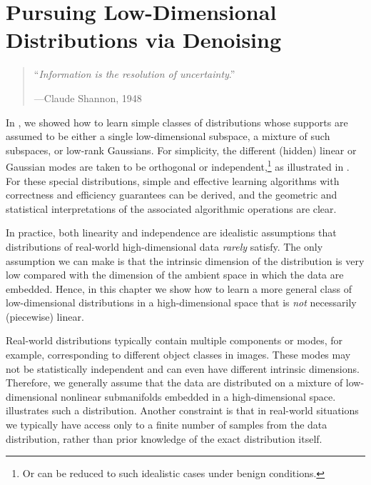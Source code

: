 \documentclass[../../book-main.tex]{subfiles}
\begin{document}
\chapter{Pursuing Low-Dimensional Distributions via Denoising}
\label{ch:denoising}

\begin{quote}
    \hfill ``\textit{Information is the resolution of uncertainty}.''

    \hfill ---Claude Shannon, 1948
\end{quote}
\vspace{5mm}

In , we showed how to learn simple classes of
distributions whose supports are assumed to be either a single
low-dimensional subspace, a mixture of such subspaces, or low-rank
Gaussians. For simplicity, the different (hidden) linear or Gaussian
modes are taken to be orthogonal or independent,\footnote{Or can be
reduced to such idealistic cases under benign conditions.} as
illustrated in . For these special distributions,
simple and effective learning algorithms with correctness and efficiency
guarantees can be derived, and the geometric and statistical
interpretations of the associated algorithmic operations are clear.

In practice, both linearity and independence are idealistic
assumptions that distributions of real-world high-dimensional data
\textit{rarely} satisfy. The only assumption we can make is that the
intrinsic dimension of the distribution is very low compared with the
dimension of the ambient space in which the data are embedded. Hence,
in this chapter we show how to learn a more general class of
low-dimensional distributions in a high-dimensional space that is
\textit{not} necessarily (piecewise) linear.

Real-world distributions typically contain multiple components or
modes, for example, corresponding to different object classes in
images. These modes may not be statistically independent and can even
have different intrinsic dimensions. Therefore, we generally
assume that the data are distributed on a mixture of low-dimensional
nonlinear submanifolds embedded in a high-dimensional space.
 illustrates such a distribution. Another
constraint is that in real-world situations we typically have access
only to a finite number of samples from the data distribution,
rather than prior knowledge of the exact distribution itself.
\end{document}
